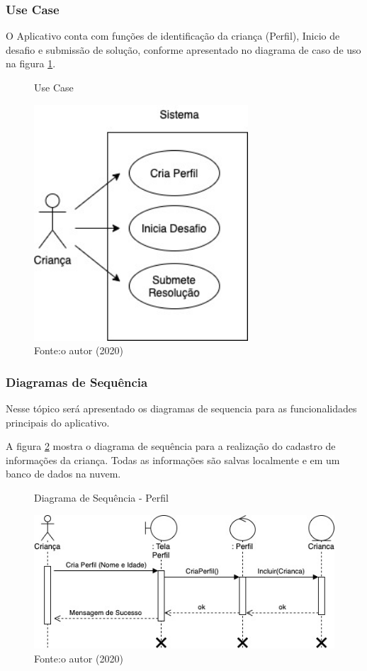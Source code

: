         \subsubsection{Use Case}
        O Aplicativo conta com funções de identificação da criança (Perfil), Inicio de desafio e submissão de solução, conforme apresentado no diagrama de caso de uso na figura \ref{figura:use_case}.
        
        \begin{figure}[h!]
            \centering
            \caption{Use Case}
            \includegraphics[width=8cm]{images/cap3/Use Case.jpg}
            \caption*{Fonte:o autor (2020)}
            \label{figura:use_case}
        \end{figure}
        
        \subsubsection{Diagramas de Sequência}
        
        Nesse tópico será apresentado os diagramas de sequencia para as funcionalidades principais do aplicativo.
        
        
        A figura \ref{figura:sequencia_perfil} mostra o diagrama de sequência para a realização do cadastro de informações da criança. Todas as informações são salvas localmente e em um banco de dados na nuvem.
        
        \begin{figure}[h!]
            \centering
            \caption{Diagrama de Sequência - Perfil}
            \includegraphics[width=12cm]{images/cap3/Sequencia_Perfil.jpg}
            \caption*{Fonte:o autor (2020)}
            \label{figura:sequencia_perfil}
        \end{figure}
        
